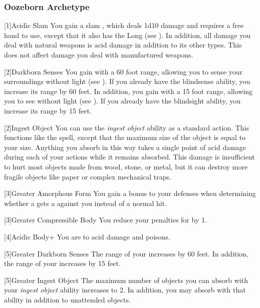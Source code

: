         \subsubsection{Oozeborn Archetype}

            [1]{Acidic Slam} You gain a slam , which deals 1d10 damage and requires a free hand to use, except that it also has the Long  (see ).
            In addition, all damage you deal with natural weapons is acid damage in addition to its other types.
            This does not affect damage you deal with manufactured weapons.

            [2]{Darkborn Senses} You gain  with a 60 foot range, allowing you to sense your surroundings without light (see ).
            If you already have the blindsense ability, you increase its range by 60 feet.
            In addition, you gain  with a 15 foot range, allowing you to see without light (see ).
            If you already have the blindsight ability, you increase its range by 15 feet.

            [2]{Ingest Object} You can use the \textit{ingest object} ability as a standard action.
            This functions like the  spell, except that the maximum size of the object is equal to your size.
            Anything you absorb in this way takes a single point of  acid damage during each of your actions while it remains absorbed.
            This damage is insufficient to hurt most objects made from wood, stone, or metal, but it can destroy more fragile objects like paper or complex mechanical traps.

            [3]{Greater Amorphous Form} You gain a  bonus to your defenses when determining whether a  gets a  against you instead of a normal hit.

            [3]{Greater Compressible Body} You reduce your penalties for \squeezing by 1.

            [4]{Acidic Body+} You are  to acid damage and poisons.

            [5]{Greater Darkborn Senses} The range of your  increases by 60 feet.
            In addition, the range of your  increases by 15 feet.

            [5]{Greater Ingest Object} The maximum number of objects you can absorb with your \textit{ingest object} ability increases to 2.
            In addition, you may absorb  with that ability in addition to unattended objects.

